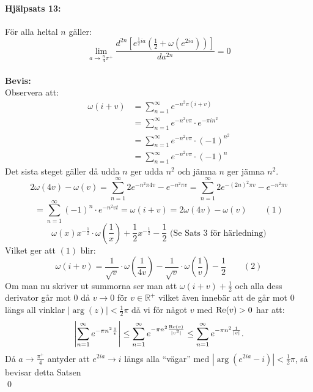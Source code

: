 \documentclass[a4paper]{article}%
\begin{document}
\paragraph{Hjälpsats 13:} För alla heltal $n$ gäller:
\[%
	\lim_{a \to \frac n 4 \pi^+} \frac {
		d^{2n} [
			e^{\frac 1 2 ia} (\frac 1 2 + \omega(e^{2ia}))
		]}
		{
			da^{2n}
		} = 0
\]
\\
{\bf Bevis:}\\
Observera att:
\newcommand{\mysum} {
	\sum_{n = 1}^\infty e^{-n^2 v \pi} \cdot
}
\begin{align*}
	\omega(i + v) &= \sum_{n = 1}^\infty e^{-n^2 \pi(i + v)} \\
		&= \mysum e^{-\pi i n^2} \\
		&= \mysum (- 1)^{n^2} \\
		&= \mysum (- 1)^n
\end{align*}
Det sista steget gäller då udda $n$ ger udda $n^2$ och jämna $n$ ger jämna $n^2$.
\[
	2 \omega(4v) - \omega(v) = \sum_{n = 1}^\infty 2 e^{-n^2 \pi 4 v} - e^{-n^2 \pi v} = \sum_{n = 1}^\infty 2
		e^{-(2n)^2\pi v} - e^{-n^2 \pi v} 
\]
\[
	= \sum_{n = 1}^\infty (-1)^n \cdot e^{-n^2 vt} = \omega(i + v) = 2 \omega(4 v) -
			\omega(v) \qquad (1)
\]
\[
	\omega(x) x^{- \frac 1 2} \cdot \omega(\frac 1 x) + \frac 1 2  x^{- \frac 1 2} - \frac 1 2 \text{ (Se Sats 3 för härledning)}
\]
Vilket ger att $(1)$ blir:
\[
	\omega(i + v) = \frac {1} {\sqrt v} \cdot \omega(\frac {1} {4v}) - \frac {1} {\sqrt v} \cdot \omega(\frac 1 v) - \frac 1 2
		\qquad (2)
\]
Om man nu skriver ut summorna ser man att $\omega(i + v) + \frac 1 2$ och alla dess derivator går
mot $0$ då $v \to 0$ för $v \in \mathbb{R}^+$
vilket även innebär att de går mot $0$ längs all vinklar $|\operatorname{arg}(z)| < \frac 1 2 \pi$ då vi för något $v$ med 
$\operatorname{Re}(v) > 0$ har att:
\[
	\left |
		 \sum_{n = 1}^\infty e^{-\pi n^2 \frac 1 v} 
	\right | \leq 
		\sum_{n = 1}^\infty e^{-\pi n^2 \frac {\operatorname{Re}(v)} {|v^2|}}
	\leq
		\sum_{n = 1}^\infty e^{-\pi n^2 \frac {1} {|v|}}.
\]
Då $a \to \frac {\pi^+} {4}$ antyder att $e^{2ia} \to i$ längs alla ``vägar''
med $|\operatorname{arg}(e^{2ia} - i) | < \frac 1 2 \pi$, så bevisar detta Satsen\\
\hfill \qed
\pagebreak
\end{document}

